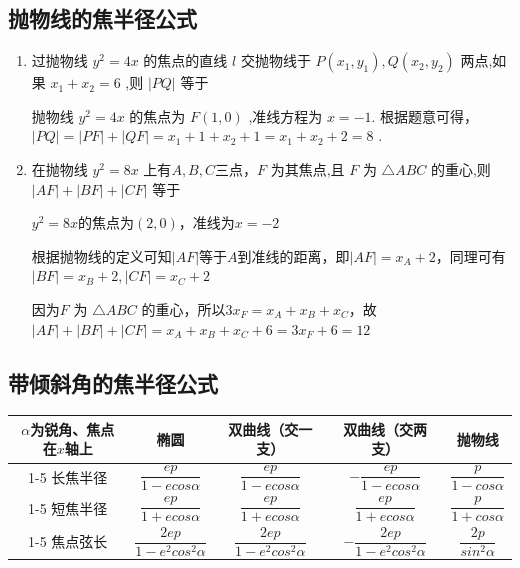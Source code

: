 \subsection*{抛物线的焦半径公式}
\begin{enumerate}
    \item 过抛物线 ${y}^{2} = {4x}$ 的焦点的直线 $l$ 交抛物线于 $P\left( {{x}_{1},{y}_{1}}\right) ,Q\left( {{x}_{2},{y}_{2}}\right)$ 两点,如果 ${x}_{1} + {x}_{2} = 6$ ,则 $\left| {PQ}\right|$ 等于
    \begin{jieda}
        抛物线 ${y}^{2} = {4x}$ 的焦点为 $F\left( {1,0}\right)$ ,准线方程为 $x =  - 1$. 根据题意可得，$\left| {PQ}\right|  = \left| {PF}\right|  + \left| {QF}\right|  = {x}_{1} + 1 + {x}_{2} + 1 = {x}_{1} + {x}_{2} + 2 = 8$ .
    \end{jieda}
    \item 在抛物线 ${y}^{2} = {8x}$ 上有$A,B,C$三点，$F$ 为其焦点,且 $F$ 为 $\bigtriangleup  {ABC}$ 的重心,则 $\left| {AF}\right|  + \left| {BF}\right|  + \left| {CF}\right|$ 等于
    \begin{jieda}
        ${y}^{2} = {8x}$的焦点为$(2, 0)$，准线为$x = -2$
        
        根据抛物线的定义可知$|AF|$等于$A$到准线的距离，即$|AF| = x_A + 2$，同理可有$|BF| = x_B + 2, |CF| = x_C + 2$
    
        因为$F$ 为 $\bigtriangleup  {ABC}$ 的重心，所以$3x_F = x_A + x_B + x_C$，故$\left| {AF}\right|  + \left| {BF}\right|  + \left| {CF}\right| = x_A + x_B + x_C + 6 = 3x_F + 6 = 12$
    \end{jieda}
\end{enumerate}
\subsection*{带倾斜角的焦半径公式}
\begin{center}
    \begin{tabular}{|c|c|c|c|c|}
    \hline
    {$\alpha$为锐角、焦点在$x$轴上} & 椭圆 & 双曲线（交一支） &  双曲线（交两支）& 抛物线 \\
    \cline{1-5}
    长焦半径 & $\dfrac{ep}{1-ecos\alpha}$ & $\dfrac{ep}{1-ecos\alpha}$ & $-\dfrac{ep}{1-ecos\alpha}$ & $\dfrac{p}{1-cos\alpha}$ \\    
    \cline{1-5}
    短焦半径 & $\dfrac{ep}{1+ecos\alpha}$ & $\dfrac{ep}{1+ecos\alpha}$ & $\dfrac{ep}{1+ecos\alpha}$ & $\dfrac{p}{1+cos\alpha}$ \\
    \cline{1-5}
    焦点弦长 & $\dfrac{2ep}{1-e^2cos^2\alpha}$ & $\dfrac{2ep}{1-e^2cos^2\alpha}$ & $-\dfrac{2ep}{1-e^2cos^2\alpha}$ & $\dfrac{2p}{sin^2\alpha}$ \\
    \hline
    \end{tabular}
    \end{center}

